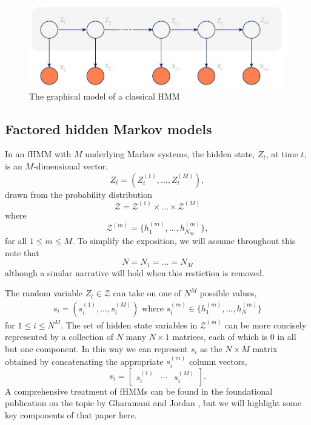 \documentclass{amsart}
\begin{document}
\begin{figure}
\centering
\includegraphics[scale=0.5]{figures/hmm.jpg}
\caption{The graphical model of a classical HMM}\label{fig:HMM}
\end{figure}

\subsection{Factored hidden Markov models}\label{sect:fhmm}
In an fHMM with $M$ underlying Markov systems, the hidden state, $Z_t$, at time $t$, is an $M$-dimensional vector,
\[
Z_t = (Z_{t}^{(1)},...,Z_{t}^{(M)}),
\]
drawn from the probability distribution
\[
\mathcal Z = \mathcal{Z}^{(1)}\times ...\times \mathcal{Z}^{(M)}
\]
where 
\[
\mathcal Z^{(m)} = \{h_1^{(m)},...,h_{N_M}^{(m)}\}, 
\]
for all $1\leq m\leq M$.  To simplify the exposition, we will assume throughout this note that 
\[
N = N_1 = ...= N_M
\]
although a similar narrative will hold when this restiction is removed. 

The random variable $Z_t\in \mathcal Z$ can take on one of $N^M$ possible values, 
\begin{eqnarray}\label{eqn:vec}
s_i = (s_{i}^{(1)},...,s_{i}^{(M)})\text{ where }s_i^{(m)}\in \{h_1^{(m)},...,h_{N}^{(m)}\}
\end{eqnarray}
for $1\leq i\leq N^M$.  The set of hidden 
state variables in $\mathcal Z^{(m)}$ can be more concisely 
represented by a collection of $N$ 
many $N\times 1$ matrices, each 
of which is 0 in all but one component.  In this way we can 
represent $s_i$ as the $N\times M$ matrix obtained by concatenating the 
appropriate $s_i^{(m)}$ column vectors,
\[
s_i = 
\left[
\begin{array}{c|c|c}
s_i^{(1)} &  \cdots & s_i^{(M)} 
\end{array}
\right].
\]
A comprehensive treatment of fHMMs can be found in the foundational publication 
on the topic by Gharamani and Jordan \cite{GJ95}, but we will highlight some 
key components of that paper here.  
\end{document}
